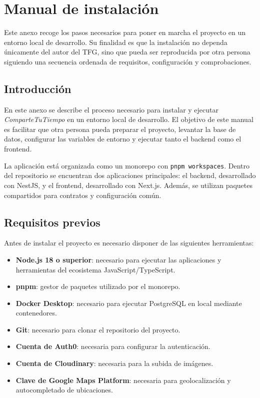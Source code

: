 \chapter{Manual de instalación}\label{anexo:manual_instalacion}

Este anexo recoge los pasos necesarios para poner en marcha el proyecto en un entorno local de desarrollo. Su finalidad es que la instalación no dependa únicamente del autor del TFG, sino que pueda ser reproducida por otra persona siguiendo una secuencia ordenada de requisitos, configuración y comprobaciones.

\section{Introducción}

En este anexo se describe el proceso necesario para instalar y ejecutar \textit{ComparteTuTiempo} en un entorno local de desarrollo. El objetivo de este manual es facilitar que otra persona pueda preparar el proyecto, levantar la base de datos, configurar las variables de entorno y ejecutar tanto el backend como el frontend.

La aplicación está organizada como un monorepo con \texttt{pnpm workspaces}. Dentro del repositorio se encuentran dos aplicaciones principales: el backend, desarrollado con NestJS, y el frontend, desarrollado con Next.js. Además, se utilizan paquetes compartidos para contratos y configuración común.

\section{Requisitos previos}

Antes de instalar el proyecto es necesario disponer de las siguientes herramientas:

\begin{itemize}
    \item \textbf{Node.js 18 o superior}: necesario para ejecutar las aplicaciones y herramientas del ecosistema JavaScript/TypeScript.
    \item \textbf{pnpm}: gestor de paquetes utilizado por el monorepo.
    \item \textbf{Docker Desktop}: necesario para ejecutar PostgreSQL en local mediante contenedores.
    \item \textbf{Git}: necesario para clonar el repositorio del proyecto.
    \item \textbf{Cuenta de Auth0}: necesaria para configurar la autenticación.
    \item \textbf{Cuenta de Cloudinary}: necesaria para la subida de imágenes.
    \item \textbf{Clave de Google Maps Platform}: necesaria para geolocalización y autocompletado de ubicaciones.
\end{itemize}

